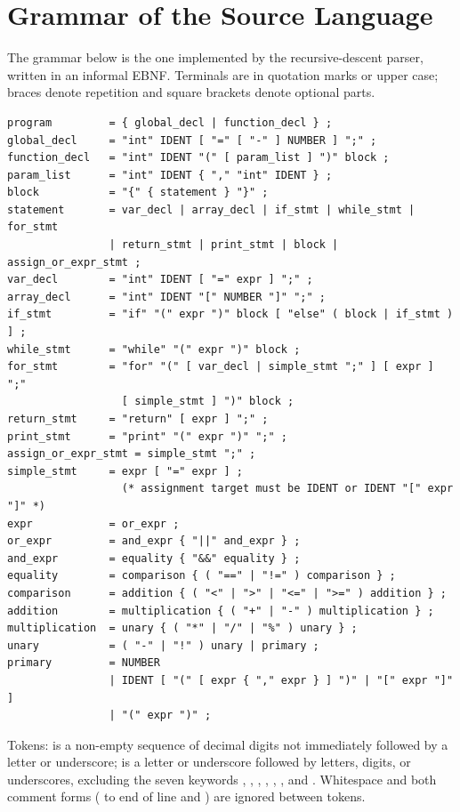 \chapter{Grammar of the Source Language}
\lstset{basicstyle=\ttfamily\scriptsize}

The grammar below is the one implemented by the recursive-descent parser, written in an informal EBNF. Terminals are in quotation marks or upper case; braces denote repetition and square brackets denote optional parts.

\begin{lstlisting}[numbers=none, caption={EBNF grammar of the C subset}, label={lst:grammar}]
program         = { global_decl | function_decl } ;
global_decl     = "int" IDENT [ "=" [ "-" ] NUMBER ] ";" ;
function_decl   = "int" IDENT "(" [ param_list ] ")" block ;
param_list      = "int" IDENT { "," "int" IDENT } ;
block           = "{" { statement } "}" ;
statement       = var_decl | array_decl | if_stmt | while_stmt | for_stmt
                | return_stmt | print_stmt | block | assign_or_expr_stmt ;
var_decl        = "int" IDENT [ "=" expr ] ";" ;
array_decl      = "int" IDENT "[" NUMBER "]" ";" ;
if_stmt         = "if" "(" expr ")" block [ "else" ( block | if_stmt ) ] ;
while_stmt      = "while" "(" expr ")" block ;
for_stmt        = "for" "(" [ var_decl | simple_stmt ";" ] [ expr ] ";"
                  [ simple_stmt ] ")" block ;
return_stmt     = "return" [ expr ] ";" ;
print_stmt      = "print" "(" expr ")" ";" ;
assign_or_expr_stmt = simple_stmt ";" ;
simple_stmt     = expr [ "=" expr ] ;
                  (* assignment target must be IDENT or IDENT "[" expr "]" *)
expr            = or_expr ;
or_expr         = and_expr { "||" and_expr } ;
and_expr        = equality { "&&" equality } ;
equality        = comparison { ( "==" | "!=" ) comparison } ;
comparison      = addition { ( "<" | ">" | "<=" | ">=" ) addition } ;
addition        = multiplication { ( "+" | "-" ) multiplication } ;
multiplication  = unary { ( "*" | "/" | "%" ) unary } ;
unary           = ( "-" | "!" ) unary | primary ;
primary         = NUMBER
                | IDENT [ "(" [ expr { "," expr } ] ")" | "[" expr "]" ]
                | "(" expr ")" ;
\end{lstlisting}

Tokens:  is a non-empty sequence of decimal digits not immediately followed by a letter or underscore;  is a letter or underscore followed by letters, digits, or underscores, excluding the seven keywords , , , , , , and . Whitespace and both comment forms (\code{//} to end of line and ) are ignored between tokens.

